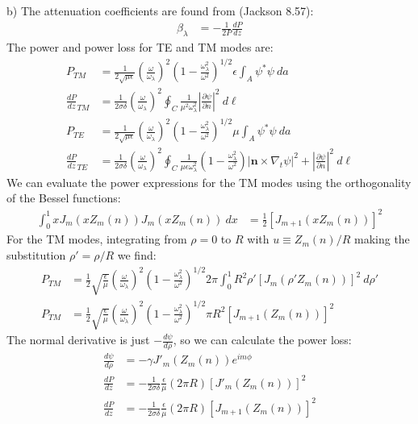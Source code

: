 \documentclass[a4paper,11pt]{article}
\numberwithin{equation}{section}
\newcommand{\bv}[1]{\mathbf{#1}}
\newcommand{\lrp}[1]{\left({#1}\right)}
\begin{document}
\\ \\
b) The attenuation coefficients are found from (Jackson 8.57):
\begin{align}
 \beta_\lambda &= -\frac{1}{2P}\frac{dP}{dz}
\end{align}
The power and power loss for TE and TM modes are:
\begin{align}
 P_{TM} &= \frac{1}{2\sqrt{\mu\epsilon}}\lrp{\frac{\omega}{\omega_\lambda}}^2 \lrp{1-\frac{\omega_\lambda^2}{\omega^2}}^{1/2}\epsilon \int_A \psi^* \psi\ da\\
 \frac{dP}{dz}_{TM} &= \frac{1}{2\sigma\delta}\lrp{\frac{\omega}{\omega_\lambda}}^2\oint_C \frac{1}{\mu^2\omega_\lambda^2}|\frac{\partial \psi}{\partial n}|^2\ d\ell\\
 P_{TE} &= \frac{1}{2\sqrt{\mu\epsilon}}\lrp{\frac{\omega}{\omega_\lambda}}^2 \lrp{1-\frac{\omega_\lambda^2}{\omega^2}}^{1/2}\mu \int_A \psi^* \psi\ da\\
 \frac{dP}{dz}_{TE} &= \frac{1}{2\sigma\delta}\lrp{\frac{\omega}{\omega_\lambda}}^2
	      \oint_C \frac{1}{\mu\epsilon\omega_\lambda^2}\lrp{1-\frac{\omega_\lambda^2}{\omega^2}}|\bv{n}\times\nabla_t\psi|^2 
	      +|\frac{\partial \psi}{\partial n}|^2\ d\ell
\end{align}
We can evaluate the power expressions for the TM modes using the orthogonality of the Bessel functions:
\begin{align}
 \int_0^1 xJ_m\lrp{xZ_m(n)}J_m\lrp{xZ_m(n)}\ dx &= \frac{1}{2}\left[J_{m+1}\lrp{xZ_m(n)}\right]^2
\end{align}
For the TM modes, integrating from $\rho=0$ to $R$ with $u \equiv Z_m(n)/R$ making the substitution $\rho' = \rho/R$ we find:
\begin{align}
 P_{TM} &= \frac{1}{2}\sqrt{\frac{\epsilon}{\mu}}\lrp{\frac{\omega}{\omega_\lambda}}^2\lrp{1-\frac{\omega_\lambda^2}{\omega^2}}^{1/2} 2\pi\int_0^1R^2\rho' \left[ J_m(\rho' Z_m(n))\right]^2\ d\rho'\\
 P_{TM} &= \frac{1}{2}\sqrt{\frac{\epsilon}{\mu}}\lrp{\frac{\omega}{\omega_\lambda}}^2\lrp{1-\frac{\omega_\lambda^2}{\omega^2}}^{1/2}\pi R^2\left[J_{m+1}(Z_m(n))\right]^2
\end{align}
The normal derivative is just $-\frac{d\psi}{d\rho}$, so we can calculate the power loss:
\begin{align}
 \frac{d\psi}{d\rho} &= -\gamma J'_m\lrp{Z_m(n)}e^{im\phi}\\
 \frac{dP}{dz} &= -\frac{1}{2\sigma\delta}\frac{\epsilon}{\mu}(2\pi R)[J'_m(Z_m(n))]^2\\
 \frac{dP}{dz} &= -\frac{1}{2\sigma\delta}\frac{\epsilon}{\mu}(2\pi R)[J_{m+1}(Z_m(n))]^2
\end{align}
\end{document}
